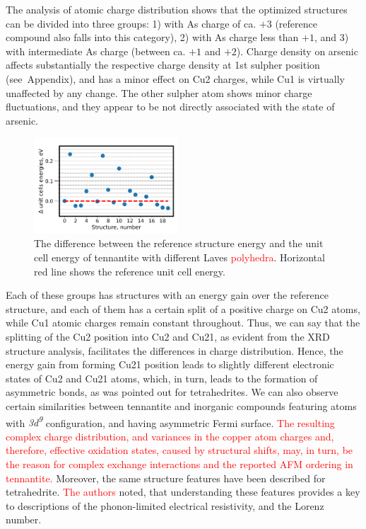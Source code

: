 \documentclass[preprint,review,12pt]{elsarticle}
\begin{document}
The analysis  of atomic charge distribution shows that the optimized structures can be divided into three groups: 1) with As charge of ca. $+3$ (reference compound also falls into this category), 2) with As charge less than $+1$, and 3) with intermediate As charge (between ca. $+1$ and $+2$).
Charge density on arsenic affects substantially the respective charge density at 1st sulpher position (see~Appendix), and has a minor effect on Cu2 charges, while Cu1 is virtually unaffected by any change.
The other sulpher atom shows minor charge fluctuations, and they appear to be not directly associated with the state of arsenic.

\begin{figure}
\centering
 \includegraphics[width=0.48\textwidth]{energy_structure_rescale_ri}
 \caption{\label{fig:energy_structure_rescale} The difference between the reference structure energy and the unit cell energy of tennantite with different Laves \textcolor{red}{polyhedra}. Horizontal red line shows the reference unit cell energy. }
\end{figure}

Each of these groups has structures with an energy gain over the reference structure, and each of them has a certain split of a positive charge on Cu2 atoms, while Cu1 atomic charges remain constant throughout.
Thus, we can say that the splitting of the Cu2 position into Cu2 and Cu21, as evident from the XRD structure analysis, facilitates the differences in charge distribution.
Hence, the energy gain from forming Cu21 position leads to slightly different electronic states of Cu2 and Cu21 atoms, which, in turn, leads to the formation of asymmetric bonds, as was pointed out for tetrahedrites\cite{Lai2015,Long2020}.
We can also observe certain similarities between tennantite and inorganic compounds featuring atoms with  {\it 3d\textsuperscript{9}}  configuration, and having asymmetric Fermi surface.
\textcolor{red}{The resulting complex charge distribution, and variances in the copper atom charges and, therefore, effective oxidation states, caused by structural shifts, may, in turn, be the reason for complex exchange interactions and the reported AFM ordering\cite{yaroslavzev2019} in tennantite.}
Moreover, the same structure features have been described for tetrahedrite\cite{DiPaola2020}.
\textcolor{red}{The authors} noted, that understanding these features provides a key to descriptions of the phonon-limited electrical resistivity, and the Lorenz number.
\end{document}
